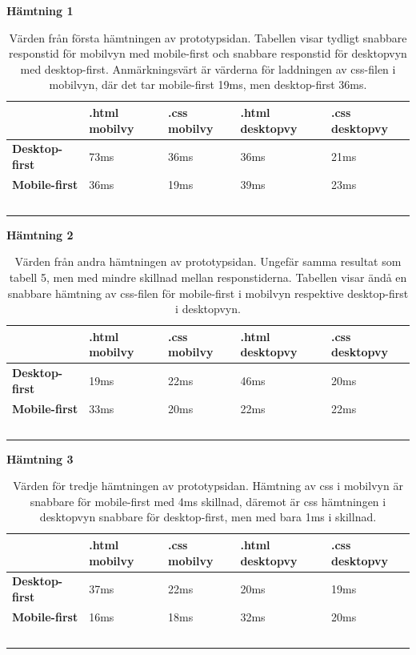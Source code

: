 \documentclass[11pt]{article}
\begin{document}
\newpage
\textbf{Hämtning 1}

\begin{table}[H]
	\centering
	\begin{tabular}{|p{2.5cm}|p{2.7cm}|p{2.4cm}|p{3.1cm}|p{2.8cm}|}
	\hline
	~&\textbf{.html mobilvy}&\textbf{.css mobilvy}&\textbf{.html desktopvy}&\textbf{.css desktopvy}\\ \hline
	\textbf{Desktop-first}&73ms&36ms&36ms&21ms\\ \hline
	\textbf{Mobile-first}&36ms&19ms&39ms&23ms \\ \hline
	~&~&~ &~&~\\ \hline
	\end{tabular}
    \caption {Värden från första hämtningen av prototypsidan. Tabellen visar tydligt snabbare responstid för mobilvyn med mobile-first och snabbare responstid för desktopvyn med desktop-first. Anmärkningsvärt är värderna för laddningen av css-filen i mobilvyn, där det tar mobile-first 19ms, men desktop-first 36ms.}
\end{table}

\textbf{Hämtning 2}

\begin{table}[H]
	\centering
	\begin{tabular}{|p{2.5cm}|p{2.7cm}|p{2.4cm}|p{3.1cm}|p{2.8cm}|}
	\hline
	~&\textbf{.html mobilvy}&\textbf{.css mobilvy}&\textbf{.html desktopvy}&\textbf{.css desktopvy}\\ \hline
	\textbf{Desktop-first}&19ms&22ms&46ms&20ms\\ \hline
	\textbf{Mobile-first}&33ms&20ms&22ms&22ms \\ \hline
	~&~&~ &~&~\\ \hline
	\end{tabular}
    \caption {Värden från andra hämtningen av prototypsidan. Ungefär samma resultat som tabell 5, men med mindre skillnad mellan responstiderna. Tabellen visar ändå en snabbare hämtning av css-filen för mobile-first i mobilvyn respektive desktop-first i desktopvyn.}
\end{table}

\textbf{Hämtning 3}

\begin{table}[H]
	\centering
	\begin{tabular}{|p{2.5cm}|p{2.7cm}|p{2.4cm}|p{3.1cm}|p{2.8cm}|}
	\hline
	~&\textbf{.html mobilvy}&\textbf{.css mobilvy}&\textbf{.html desktopvy}&\textbf{.css desktopvy}\\ \hline
	\textbf{Desktop-first}&37ms&22ms&20ms&19ms\\ \hline
	\textbf{Mobile-first}&16ms&18ms&32ms&20ms \\ \hline
	~&~&~ &~&~\\ \hline
	\end{tabular}
    \caption {Värden för tredje hämtningen av prototypsidan. Hämtning av css i mobilvyn är snabbare för mobile-first med 4ms skillnad, däremot är css hämtningen i desktopvyn snabbare för desktop-first, men med bara 1ms i skillnad.}
\end{table}
\end{document}
